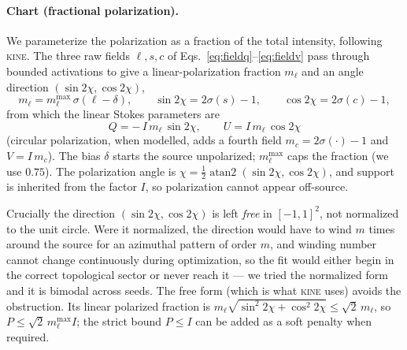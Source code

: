 \documentclass[11pt]{article}
\newcommand{\kine}{\textsc{\small{kine}}\xspace}
\begin{document}
\paragraph{Chart (fractional polarization).}
\label{sec:chart}
We parameterize the polarization as a fraction of the total intensity, following
\kine. The three raw fields $\ell,s,c$ of
Eqs.~\eqref{eq:fieldq}--\eqref{eq:fieldv} pass through bounded activations to give a
linear-polarization fraction $m_\ell$ and an angle direction
$(\sin2\chi,\cos2\chi)$,
\begin{equation}
  m_\ell = m_\ell^{\max}\,\sigma(\ell-\delta), \qquad
  \sin2\chi = 2\sigma(s)-1, \qquad
  \cos2\chi = 2\sigma(c)-1,
  \label{eq:kine}
\end{equation}
from which the linear Stokes parameters are
\begin{equation}
  \boxed{\;Q = -\,I\,m_\ell\,\sin2\chi, \qquad U = I\,m_\ell\,\cos2\chi\;}
  \label{eq:expm}
\end{equation}
(circular polarization, when modelled, adds a fourth field $m_c=2\sigma(\cdot)-1$
and $V=I\,m_c$). The bias $\delta$ starts the source unpolarized; $m_\ell^{\max}$
caps the fraction (we use $0.75$). The polarization angle is
$\chi=\tfrac12\operatorname{atan2}(\sin2\chi,\cos2\chi)$, and support is inherited
from the factor $I$, so polarization cannot appear off-source.

Crucially the direction $(\sin2\chi,\cos2\chi)$ is left \emph{free} in $[-1,1]^2$,
not normalized to the unit circle. Were it normalized, the direction would have to
wind $m$ times around the source for an azimuthal pattern of order $m$, and winding
number cannot change continuously during optimization, so the fit would either
begin in the correct topological sector or never reach it --- we tried the
normalized form and it is bimodal across seeds. The free form (which is what \kine
uses) avoids the obstruction. Its linear polarized fraction is
$m_\ell\sqrt{\sin^2 2\chi+\cos^2 2\chi}\le\sqrt2\,m_\ell$, so
$P\le\sqrt2\,m_\ell^{\max} I$; the strict bound $P\le I$ can be added as a soft
penalty when required.
\end{document}
